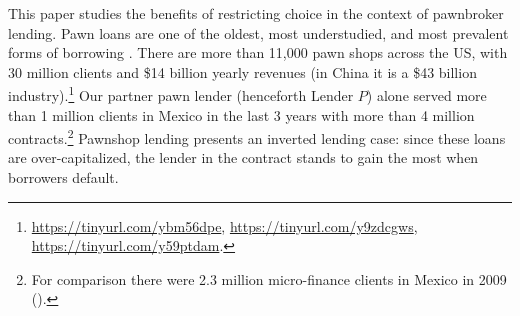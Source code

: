 \documentclass[oneside,11pt]{article}
\begin{document}

This paper studies the benefits of restricting choice in the context of pawnbroker lending. Pawn loans are one of the oldest, most understudied, and most prevalent forms of borrowing \citep{carter2012pawnshops}. There are more than 11,000 pawn shops across the US, with 30 million clients and \$14 billion yearly revenues (in China it is a \$43 billion industry).\footnote{\url{https://tinyurl.com/ybm56dpe}, \url{https://tinyurl.com/y9zdcgws}, \url{https://tinyurl.com/y59ptdam}.} Our partner pawn lender (henceforth Lender $P$) alone served more than 1 million clients in Mexico in the last 3 years with more than 4 million contracts.\footnote{For comparison there were 2.3 million micro-finance clients in Mexico in 2009 (\cite{Pedroza:2010}).} Pawnshop lending presents an inverted lending case: since these loans are over-capitalized, the lender in the contract stands to gain the most when borrowers default. 
\end{document}
